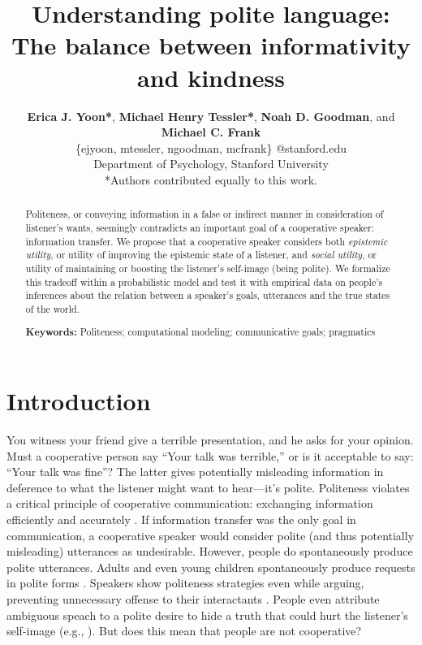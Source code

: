 \documentclass[10pt,letterpaper]{article}
\title{Understanding polite language: \\
The balance between informativity and kindness}
\author{ {\large \bf Erica J. Yoon*}, {\large \bf Michael Henry Tessler*}, {\large \bf Noah D. Goodman}, and {\large \bf Michael C. Frank}   \\
\{ejyoon, mtessler, ngoodman, mcfrank\} @stanford.edu \\ 
  Department of Psychology, Stanford University \\
  *Authors contributed equally to this work.}
\begin{document}
\maketitle


\begin{abstract}

Politeness, or conveying information in a false or indirect manner in consideration of listener's wants,
seemingly contradicts an important goal of a cooperative speaker: information transfer.
We propose that a cooperative speaker considers both
\emph{epistemic utility}, or utility of improving the epistemic state of a listener, 
and \emph{social utility}, or utility of maintaining or boosting the listener's self-image (being polite). 
We formalize this tradeoff within a probabilistic model and test it with empirical data on people's inferences about the relation between a speaker's goals, utterances and the true states of the world.

\textbf{Keywords:} 
Politeness; computational modeling; communicative goals; pragmatics

\end{abstract}


\section{Introduction}
You witness your friend give a terrible presentation, and he asks for your opinion. 
Must a cooperative person say ``Your talk was terrible,'' or is it acceptable to say: ``Your talk was fine''?
The latter gives potentially misleading information in deference to what the listener might want to hear---it's polite.
%
Politeness violates a critical principle of cooperative communication: exchanging information efficiently and accurately \cite{Grice1975}. 
If information transfer was the only goal in communication, a cooperative speaker would consider polite (and thus potentially misleading) utterances as undesirable. 
However, people do spontaneously produce polite utterances.
Adults and even young children spontaneously produce requests in polite forms \cite{clark1980, axia1985}. 
Speakers show politeness strategies even while arguing, preventing unnecessary offense to their interactants \cite{holtgraves1997}.
People even attribute ambiguous speach to a polite desire to hide a truth that could hurt the listener's self-image (e.g., ). 
But does this mean that people are not cooperative? 
\end{document}
